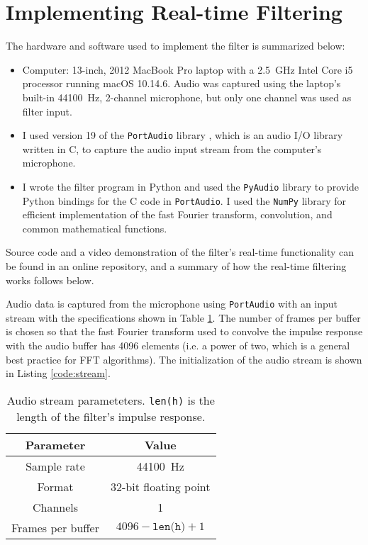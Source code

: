 \section{Implementing Real-time Filtering}
The hardware and software used to implement the filter is summarized below:
\begin{itemize}

    \item Computer: 13-inch, 2012 MacBook Pro laptop with a \SI{2.5}{\giga \hertz} Intel Core i5 processor running macOS 10.14.6. Audio was captured using the laptop's built-in \SI{44100}{\hertz}, 2-channel microphone, but only one channel was used as filter input.

    \item I used version 19 of the \texttt{PortAudio} library \cite{portaudio}, which is an audio I/O library written in C, to capture the audio input stream from the computer's microphone.

    \item I wrote the filter program in Python and used the \texttt{PyAudio} library \cite{pyaudio} to provide Python bindings for the C code in \texttt{PortAudio}.
    I used the \texttt{NumPy} library \cite{numpy} for efficient implementation of the fast Fourier transform, convolution, and common mathematical functions.

\end{itemize}
Source code and a video demonstration of the filter's real-time functionality can be found in an online repository, and a summary of how the real-time filtering works follows below.


Audio data is captured from the microphone using \texttt{PortAudio} with an input stream with the specifications shown in Table \ref{tab:stream}. The number of frames per buffer is chosen so that the fast Fourier transform used to convolve the impulse response with the audio buffer has 4096 elements (i.e. a power of two, which is a general best practice for FFT algorithms). The initialization of the audio stream is shown in Listing \ref{code:stream}.

\begin{table}[htb!]
    \centering
    \begin{tabular}{|c|c|}
        \hline
        Parameter & Value\\
        \hline
        \hline
        Sample rate & \SI{44100}{\hertz}\\
        Format & 32-bit floating point\\
        Channels & 1\\
        Frames per buffer & $ 4096 - \texttt{len(h)} + 1 $\\
        \hline
    \end{tabular}
    \caption{Audio stream parameteters. \texttt{len(h)} is the length of the filter's impulse response.}
    \label{tab:stream}
\end{table}

